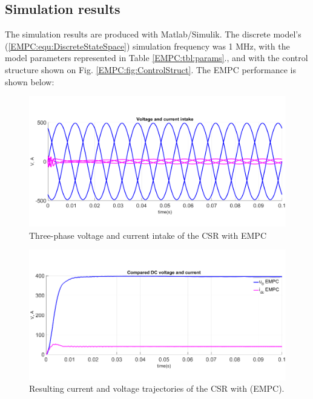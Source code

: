     \subsection{Simulation results}\label{EMPC:sec:Results}

    The simulation results are produced with Matlab/Simulik. The discrete model's (\ref{EMPC:equ:DiscreteStateSpace}) simulation frequency was 1 MHz, with the model parameters represented in Table \ref{EMPC:tbl:params}., and with the control structure shown on Fig. \ref{EMPC:fig:ControlStruct}. The EMPC performance is shown below:

    \begin{figure}[!ht]
        \centering
        \includegraphics[width=\textwidth]{EMPC_PNG_Pics/Result_3fEMPC.png}
        \caption{Three-phase voltage and current intake of the CSR with EMPC}
        \label{EMPC:fig:Result_3fEMPC}
    \end{figure}

    \begin{figure}[!ht]
        \centering
        \includegraphics[width=\textwidth]{EMPC_PNG_Pics/Result_PerformanceEMPC.png}
        \caption{Resulting current and voltage trajectories of the CSR with (EMPC).}
        \label{EMPC:fig:Result_PerformanceEMPC}
    \end{figure}

